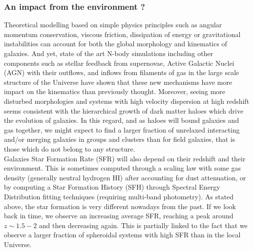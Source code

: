 \subsubsection{An impact from the environment ?}

Theoretical modelling based on simple physics principles such as angular momentum conservation, viscous friction, dissipation of energy or gravitational instabilities can account for both the global morphology and kinematics of galaxies. And yet, state of the art N-body simulations including other components such as stellar feedback from supernovae, Active Galactic Nuclei (AGN) with their outflows, and inflows from filaments of gas in the large scale structure of the Universe have shown that these new mechanisms have more impact on the kinematics than previously thought. Moreover, seeing more disturbed morphologies and systems with high velocity dispersion at high redshift seems consistent with the hierarchical growth of dark matter haloes which drive the evolution of galaxies. In this regard, and as haloes will bound galaxies and gas together, we might expect to find a larger fraction of unrelaxed interacting and/or merging galaxies in groups and clusters than for field galaxies, that is those which do not belong to any structure. \\


Galaxies Star Formation Rate (SFR) will also depend on their redshift and their environment. This is sometimes computed through a scaling law with some gas density (generally neutral hydrogen HI) after accounting for dust attenuation, or by computing a Star Formation History (SFH) through Spectral Energy Distribution fitting techniques (requiring multi-band photometry). As stated above, the star formation is very different nowadays from the past. If we look back in time, we observe an increasing average SFR, reaching a peak around $z \sim 1.5 - 2$ and then decreasing again. This is partially linked to the fact that we observe a larger fraction of spheroidal systems with high SFR than in the local Universe. \\

